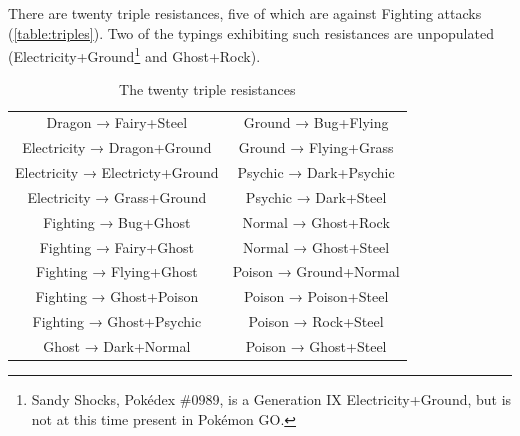 

There are twenty triple resistances, five of which are against Fighting attacks (\autoref{table:triples}).
Two of the typings exhibiting such resistances are unpopulated
  (Electricity+Ground\footnote{Sandy Shocks, Pokédex \#0989, is a Generation IX
  Electricity+Ground, but is not at this time present in Pokémon GO.} and Ghost+Rock).
\begin{table}[h]
  \begin{center}
    \begin{tabular}{cc}
Dragon → Fairy+Steel & Ground → Bug+Flying \\
Electricity → Dragon+Ground & Ground → Flying+Grass \\
Electricity → Electricty+Ground & Psychic → Dark+Psychic \\
Electricity → Grass+Ground & Psychic → Dark+Steel \\
Fighting → Bug+Ghost & Normal → Ghost+Rock \\
Fighting → Fairy+Ghost & Normal → Ghost+Steel \\
Fighting → Flying+Ghost & Poison → Ground+Normal \\
Fighting → Ghost+Poison & Poison → Poison+Steel \\
Fighting → Ghost+Psychic & Poison → Rock+Steel \\
Ghost → Dark+Normal & Poison → Ghost+Steel \\
    \end{tabular}
    \caption{The twenty triple resistances}
    \label{table:triples}
  \end{center}
\end{table}

